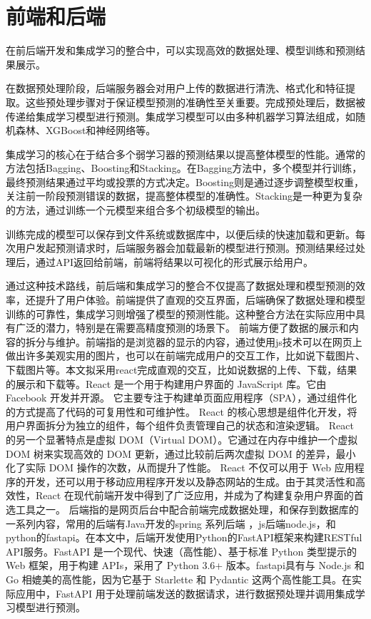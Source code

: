 \documentclass[AutoFakeBold]{LZUThesis-PgD&PhD}
\begin{document}
\section{前端和后端}
在前后端开发和集成学习的整合中，可以实现高效的数据处理、模型训练和预测结果展示。

在数据预处理阶段，后端服务器会对用户上传的数据进行清洗、格式化和特征提取。这些预处理步骤对于保证模型预测的准确性至关重要。完成预处理后，数据被传递给集成学习模型进行预测。集成学习模型可以由多种机器学习算法组成，如随机森林、XGBoost和神经网络等。

集成学习的核心在于结合多个弱学习器的预测结果以提高整体模型的性能。通常的方法包括Bagging、Boosting和Stacking。在Bagging方法中，多个模型并行训练，最终预测结果通过平均或投票的方式决定。Boosting则是通过逐步调整模型权重，关注前一阶段预测错误的数据，提高整体模型的准确性。Stacking是一种更为复杂的方法，通过训练一个元模型来组合多个初级模型的输出。

训练完成的模型可以保存到文件系统或数据库中，以便后续的快速加载和更新。每次用户发起预测请求时，后端服务器会加载最新的模型进行预测。预测结果经过处理后，通过API返回给前端，前端将结果以可视化的形式展示给用户。

通过这种技术路线，前后端和集成学习的整合不仅提高了数据处理和模型预测的效率，还提升了用户体验。前端提供了直观的交互界面，后端确保了数据处理和模型训练的可靠性，集成学习则增强了模型的预测性能。这种整合方法在实际应用中具有广泛的潜力，特别是在需要高精度预测的场景下。
前端方便了数据的展示和内容的拆分与维护。前端指的是浏览器的显示的内容，通过使用js技术可以在网页上做出许多美观实用的图片，也可以在前端完成用户的交互工作，比如说下载图片、下载图片等。本文拟采用react完成直观的交互，比如说数据的上传、下载，结果的展示和下载等。React 是一个用于构建用户界面的 JavaScript 库。它由 Facebook 开发并开源。
它主要专注于构建单页面应用程序（SPA），通过组件化的方式提高了代码的可复用性和可维护性。 React 的核心思想是组件化开发，将用户界面拆分为独立的组件，每个组件负责管理自己的状态和渲染逻辑。 React 的另一个显著特点是虚拟 DOM（Virtual DOM）。它通过在内存中维护一个虚拟 DOM 树来实现高效的 DOM 更新，通过比较前后两次虚拟 DOM 的差异，最小化了实际 DOM 操作的次数，从而提升了性能。 React 不仅可以用于 Web 应用程序的开发，还可以用于移动应用程序开发以及静态网站的生成。由于其灵活性和高效性，React 在现代前端开发中得到了广泛应用，并成为了构建复杂用户界面的首选工具之一。
后端指的是网页后台中配合前端完成数据处理，和保存到数据库的一系列内容，常用的后端有Java开发的spring 系列后端 ，js后端node.js，和python的fastapi。在本文中，后端开发使用Python的FastAPI框架来构建RESTful API服务。FastAPI 是一个现代、快速（高性能）、基于标准 Python 类型提示的 Web 框架，用于构建 APIs，采用了 Python 3.6+ 版本。fastapi具有与 Node.js 和 Go 相媲美的高性能，因为它基于 Starlette 和 Pydantic 这两个高性能工具。在实际应用中，FastAPI 用于处理前端发送的数据请求，进行数据预处理并调用集成学习模型进行预测。
\end{document}
